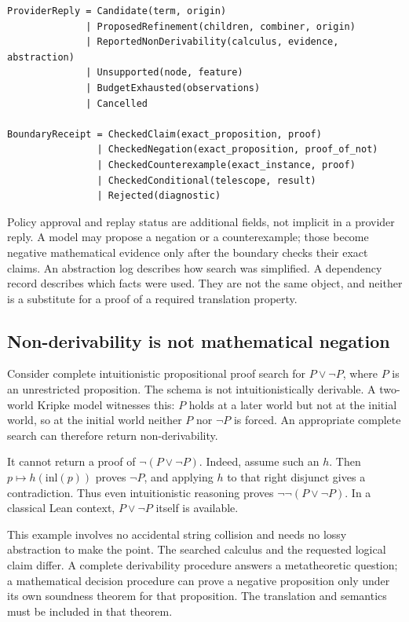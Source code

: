 \documentclass[11pt,letterpaper]{article}
\numberwithin{equation}{section}
\begin{document}
\par\noindent\begin{minipage}{\linewidth}
\begin{lstlisting}
ProviderReply = Candidate(term, origin)
              | ProposedRefinement(children, combiner, origin)
              | ReportedNonDerivability(calculus, evidence, abstraction)
              | Unsupported(node, feature)
              | BudgetExhausted(observations)
              | Cancelled

BoundaryReceipt = CheckedClaim(exact_proposition, proof)
                | CheckedNegation(exact_proposition, proof_of_not)
                | CheckedCounterexample(exact_instance, proof)
                | CheckedConditional(telescope, result)
                | Rejected(diagnostic)
\end{lstlisting}
\end{minipage}\par


Policy approval and replay status are additional fields, not implicit in a
provider reply. A model may propose a negation or a counterexample; those become
negative mathematical evidence only after the boundary checks their exact claims.
An abstraction log describes how search was simplified. A dependency record
describes which facts were used. They are not the same object, and neither is a
substitute for a proof of a required translation property.

\subsection{Non-derivability is not mathematical negation}\label{sec:negative}
Consider complete intuitionistic propositional proof search for $P\lor\neg P$,
where $P$ is an unrestricted proposition. The schema is not intuitionistically
derivable. A two-world Kripke model witnesses this: $P$ holds at a later world
but not at the initial world, so at the initial world neither $P$ nor $\neg P$
is forced. An appropriate complete search can therefore return non-derivability.

It cannot return a proof of $\neg(P\lor\neg P)$. Indeed, assume such an $h$.
Then $p\mapsto h(\mathrm{inl}(p))$ proves $\neg P$, and applying $h$ to that
right disjunct gives a contradiction. Thus even intuitionistic reasoning proves
$\neg\neg(P\lor\neg P)$. In a classical Lean context, $P\lor\neg P$ itself
is available.

This example involves no accidental string collision and needs no lossy
abstraction to make the point. The searched calculus and the requested logical
claim differ. A complete derivability procedure answers a metatheoretic question;
a mathematical decision procedure can prove a negative proposition only under
its own soundness theorem for that proposition. The translation and semantics
must be included in that theorem.
\end{document}
